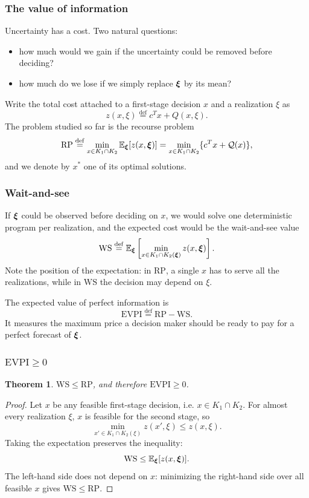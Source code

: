 \documentclass[aspectratio=169]{beamer}
\newtheorem{theo}{Theorem}
\newcommand{\WS}{\mathrm{WS}}
\newcommand{\RP}{\mathrm{RP}}
\newcommand{\EVPI}{\mathrm{EVPI}}
\begin{document}
\begin{frame}
\frametitle{The value of information}

Uncertainty has a cost.
Two natural questions:
\begin{itemize}
\item
how much would we gain if the uncertainty could be removed {\red before} deciding?
\item
how much do we lose if we simply replace ${\boldsymbol{\xi}}$ by its mean?
\end{itemize}

\mbox{}

Write the total cost attached to a first-stage decision $x$ and a realization $\xi$ as
\[
z(x,\xi) \overset{\mathrm{def}}{=} c^Tx + Q(x,\xi).
\]
The problem studied so far is the {\red recourse problem}
\[
\RP \overset{\mathrm{def}}{=} \min_{x \in K_1 \cap K_2} \EE_{\bsxi}[z(x,\bsxi)] = \min_{x \in K_1 \cap K_2} \lbrace c^Tx + \calQ(x) \rbrace,
\]
and we denote by $x^*$ one of its optimal solutions.

\end{frame}

\begin{frame}
\frametitle{Wait-and-see}

If ${\boldsymbol{\xi}}$ could be observed {\red before} deciding on $x$, we would solve one deterministic program per realization, and the expected cost would be the {\red wait-and-see} value
\[
\WS \overset{\mathrm{def}}{=} \EE_{\bsxi} \left[ \min_{x \in K_1 \cap K_2(\bsxi)} z(x,\bsxi) \right].
\]
Note the position of the expectation: in $\RP$, a {\blue single} $x$ has to serve all the realizations, while in $\WS$ the decision may depend on $\xi$.

\mbox{}

The {\red expected value of perfect information} is
\[
\EVPI \overset{\mathrm{def}}{=} \RP - \WS.
\]
It measures the maximum price a decision maker should be ready to pay for a perfect forecast of ${\boldsymbol{\xi}}$.

\end{frame}

\begin{frame}
\frametitle{$\EVPI \geq 0$}

\begin{theo}
$\WS \leq \RP$, and therefore $\EVPI \geq 0$.
\end{theo}

\begin{proof}
Let $x$ be any feasible first-stage decision, i.e. $x \in K_1 \cap K_2$.
For almost every realization $\xi$, $x$ is feasible for the second stage, so
\[
\min_{x' \in K_1 \cap K_2(\xi)} z(x',\xi) \leq z(x,\xi).
\]
Taking the expectation preserves the inequality:
\[
\WS \leq \EE_{\bsxi}[z(x,\bsxi)].
\]
The left-hand side does not depend on $x$: minimizing the right-hand side over all feasible $x$ gives $\WS \leq \RP$.
\end{proof}

\end{frame}
\end{document}
